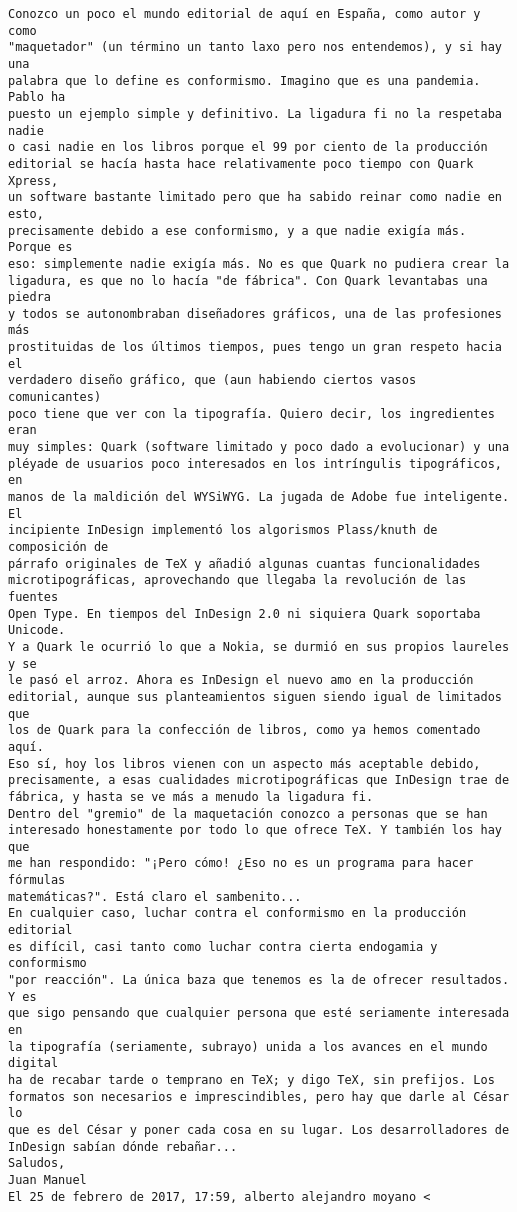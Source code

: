 \documentclass[a4paper,10pt]{article}
\begin{document}
\begin{lstlisting}
Conozco un poco el mundo editorial de aquí en España, como autor y como
"maquetador" (un término un tanto laxo pero nos entendemos), y si hay una
palabra que lo define es conformismo. Imagino que es una pandemia. Pablo ha
puesto un ejemplo simple y definitivo. La ligadura fi no la respetaba nadie
o casi nadie en los libros porque el 99 por ciento de la producción
editorial se hacía hasta hace relativamente poco tiempo con Quark Xpress,
un software bastante limitado pero que ha sabido reinar como nadie en esto,
precisamente debido a ese conformismo, y a que nadie exigía más. Porque es
eso: simplemente nadie exigía más. No es que Quark no pudiera crear la
ligadura, es que no lo hacía "de fábrica". Con Quark levantabas una piedra
y todos se autonombraban diseñadores gráficos, una de las profesiones más
prostituidas de los últimos tiempos, pues tengo un gran respeto hacia el
verdadero diseño gráfico, que (aun habiendo ciertos vasos comunicantes)
poco tiene que ver con la tipografía. Quiero decir, los ingredientes eran
muy simples: Quark (software limitado y poco dado a evolucionar) y una
pléyade de usuarios poco interesados en los intríngulis tipográficos, en
manos de la maldición del WYSiWYG. La jugada de Adobe fue inteligente. El
incipiente InDesign implementó los algorismos Plass/knuth de composición de
párrafo originales de TeX y añadió algunas cuantas funcionalidades
microtipográficas, aprovechando que llegaba la revolución de las fuentes
Open Type. En tiempos del InDesign 2.0 ni siquiera Quark soportaba Unicode.
Y a Quark le ocurrió lo que a Nokia, se durmió en sus propios laureles y se
le pasó el arroz. Ahora es InDesign el nuevo amo en la producción
editorial, aunque sus planteamientos siguen siendo igual de limitados que
los de Quark para la confección de libros, como ya hemos comentado aquí.
Eso sí, hoy los libros vienen con un aspecto más aceptable debido,
precisamente, a esas cualidades microtipográficas que InDesign trae de
fábrica, y hasta se ve más a menudo la ligadura fi.
Dentro del "gremio" de la maquetación conozco a personas que se han
interesado honestamente por todo lo que ofrece TeX. Y también los hay que
me han respondido: "¡Pero cómo! ¿Eso no es un programa para hacer fórmulas
matemáticas?". Está claro el sambenito...
En cualquier caso, luchar contra el conformismo en la producción editorial
es difícil, casi tanto como luchar contra cierta endogamia y conformismo
"por reacción". La única baza que tenemos es la de ofrecer resultados. Y es
que sigo pensando que cualquier persona que esté seriamente interesada en
la tipografía (seriamente, subrayo) unida a los avances en el mundo digital
ha de recabar tarde o temprano en TeX; y digo TeX, sin prefijos. Los
formatos son necesarios e imprescindibles, pero hay que darle al César lo
que es del César y poner cada cosa en su lugar. Los desarrolladores de
InDesign sabían dónde rebañar...
Saludos,
Juan Manuel
El 25 de febrero de 2017, 17:59, alberto alejandro moyano <


\end{lstlisting}
\end{document}
